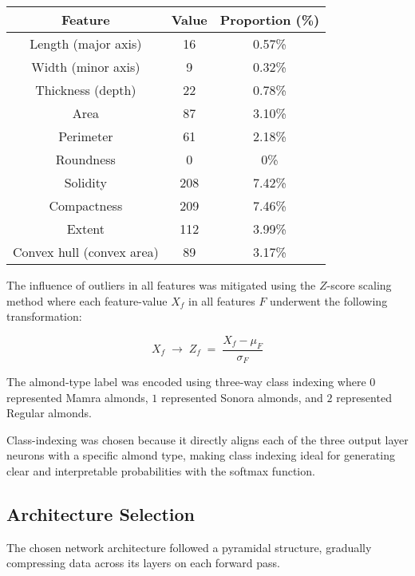 \begin{table}[h]
    \label{table_feature_values}
    \begin{center}
    \begin{tabular}{|c||c|c|}
    \hline
    \textbf{Feature} & \textbf{Value} & \textbf{Proportion (\%)} \\
    \hline
    Length (major axis) & 16 & 0.57\% \\
    \hline
    Width (minor axis) & 9 & 0.32\% \\
    \hline
    Thickness (depth) & 22 & 0.78\% \\
    \hline
    Area & 87 & 3.10\% \\
    \hline
    Perimeter & 61 & 2.18\% \\
    \hline
    Roundness & 0 & 0\% \\
    \hline
    Solidity & 208 & 7.42\% \\
    \hline
    Compactness & 209 & 7.46\% \\
    \hline
    Extent & 112 & 3.99\% \\
    \hline
    Convex hull (convex area) & 89 & 3.17\% \\
    \hline
    \end{tabular}
    \end{center}
    \end{table}

The influence of outliers in all features was mitigated using the $Z$-score scaling method 
where each feature-value $X_f$ in all features $F$ underwent the following transformation:

$$
X_f \; \rightarrow \; Z_f 
\; = \; \frac{X_f - \mu_F}{\sigma_F} 
$$

The almond-type label was encoded using three-way class indexing where $0$ represented Mamra almonds, 
$1$ represented Sonora almonds, and $2$ represented Regular almonds.

Class-indexing was chosen because it directly aligns each of the three output layer neurons with a 
specific almond type, making class indexing ideal for generating clear and interpretable probabilities 
with the softmax function.

\subsection{Architecture Selection}

The chosen network architecture followed a pyramidal structure, gradually
compressing data across its layers on each forward pass.

